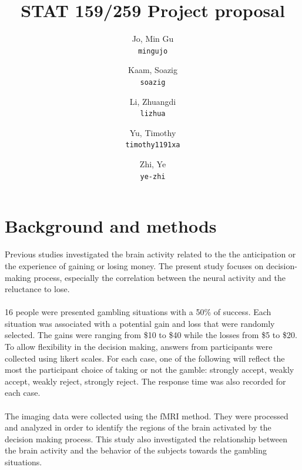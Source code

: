 \documentclass{article}
\begin{document}
\title{STAT 159/259 Project proposal }
\author{
  Jo, Min Gu\\
  \texttt{mingujo}
  \and
  Kaam, Soazig\\
  \texttt{soazig}
  \and
  Li, Zhuangdi\\
  \texttt{lizhua}
  \and
  Yu, Timothy\\
  \texttt{timothy1191xa}
  \and
  Zhi, Ye\\
  \texttt{ye-zhi}
  }

\maketitle


\section{Background and methods}
\noindent
Previous studies investigated the brain activity related to the the anticipation or the experience of gaining or losing money. The present study focuses on decision-making process, especially the correlation between the neural activity and the reluctance to lose.\\\\
16 people were presented gambling situations with a 50\% of success. Each situation was associated with a potential gain and loss that were randomly selected. The gains were ranging from \$10 to \$40 while the losses from \$5 to \$20. To allow flexibility in the decision making, answers from participants were collected using likert scales. For each case, one of the following will reflect the most the participant choice of taking or not the gamble: strongly accept, weakly accept, weakly reject, strongly reject. The response time was also recorded for each case. \\\\
The imaging data were collected using the fMRI method. They were processed and analyzed in order to identify the regions of the brain activated by the decision making process. This study also investigated the relationship between the brain activity and the behavior of the subjects towards the gambling situations. 
\end{document}
